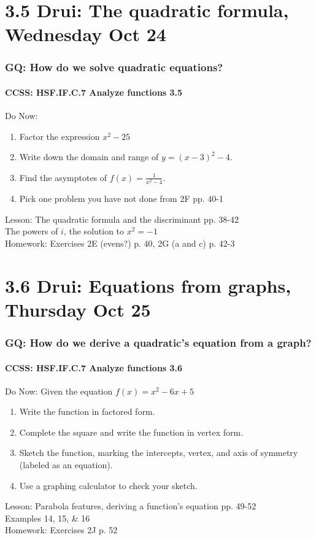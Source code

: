 \documentclass{beamer}
\begin{document}
\section{3.5 Drui: The quadratic formula, Wednesday Oct 24}
  \frame
  {
    \frametitle{GQ: How do we solve quadratic equations?}
    \framesubtitle{CCSS: HSF.IF.C.7 Analyze functions    \alert{3.5}}

    \begin{block}{Do Now: }
      \begin{enumerate}
          \item Factor the expression $x^2-25$
          \item Write down the domain and range of $y=(x-3)^2-4$.
          \item Find the asymptotes of $\displaystyle f(x)=\frac{1}{x^2-4}$.
          \item Pick one problem you have not done from 2F pp. 40-1
      \end{enumerate}
    \end{block}
    Lesson: The quadratic formula and the discriminant pp. 38-42 \\
    The powers of $i$, the solution to $x^2=-1$\\ \bigskip
    Homework: Exercises 2E (evens?) p. 40, 2G (a and c) p. 42-3
  }

\section{3.6 Drui: Equations from graphs, Thursday Oct 25}
  \frame
  {
    \frametitle{GQ: How do we derive a quadratic's equation from a graph?}
    \framesubtitle{CCSS: HSF.IF.C.7 Analyze functions    \alert{3.6}}

    \begin{block}{Do Now: Given the equation $f(x)=x^2-6x+5$}
      \begin{enumerate}
          \item Write the function in factored form.
          \item Complete the square and write the function in vertex form.
          \item Sketch the function, marking the intercepts, vertex, and axis of symmetry (labeled as an equation).
          \item Use a graphing calculator to check your sketch.
      \end{enumerate}
    \end{block}
    Lesson: Parabola features, deriving a function's equation pp. 49-52 \\
    Examples 14, 15, \& 16\\ \bigskip
    Homework: Exercises 2J p. 52
  }
\end{document}
